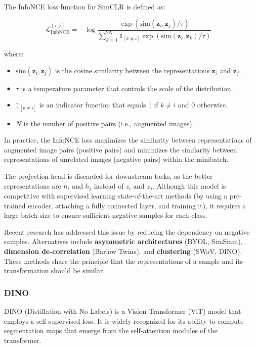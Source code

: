 The InfoNCE loss function for SimCLR is defined as:

$$
\mathcal{L}^{(i,j)}_{\text{InfoNCE}} = - \log \frac{\exp(\text{sim}(\mathbf{z}_i, \mathbf{z}_j)/\tau)}{\sum_{k=1}^{2N} \mathbb{1}_{[k \neq i]} \exp(\text{sim}(\mathbf{z}_i, \mathbf{z}_k)/\tau)}
$$

where:
\begin{itemize}
    \item $\text{sim}(\mathbf{z}_i, \mathbf{z}_j)$ is the cosine similarity between the representations $\mathbf{z}_i$ and $\mathbf{z}_j$.

    \item $\tau$ is a temperature parameter that controls the scale of the distribution.
    \item $\mathbb{1}_{[k \neq i]}$ is an indicator function that equals 1 if $k \neq i$ and 0 otherwise.
    \item $N$ is the number of positive pairs (i.e., augmented images).
\end{itemize}

In practice, the InfoNCE loss maximizes the similarity between representations of augmented image pairs (positive pairs) and minimizes the similarity between representations of unrelated images (negative pairs) within the minibatch.

The projection head is discarded for downstream tasks, as the better representations are $ h_i $ and $h_j$ instead of $z_i$ and $z_j$. Although this model is competitive with supervised learning state-of-the-art methods (by using a pre-trained encoder, attaching a fully connected layer, and training it), it requires a large batch size to ensure sufficient negative samples for each class.

Recent research has addressed this issue by reducing the dependency on negative samples. Alternatives include \textbf{asymmetric architectures} (BYOL, SimSiam), \textbf{dimension de-correlation} (Barlow Twins), and \textbf{clustering} (SWaV, DINO). These methods share the principle that the representations of a sample and its transformation should be similar.

\subsubsection{DINO}

DINO (Distillation with No Labels) is a Vision Transformer (ViT) model that employs a self-supervised loss. It is widely recognized for its ability to compute segmentation maps that emerge from the self-attention modules of the transformer.

